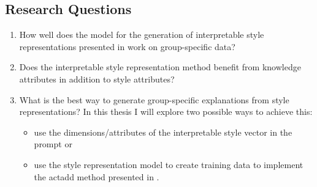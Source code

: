 \subsection{Research Questions}
\begin{enumerate}
  \item How well does the model for the generation of interpretable style representations presented in \citet{patelLearningInterpretableStyle2023} work on group-specific data?
  \item Does the interpretable style representation method benefit from knowledge attributes in addition to style attributes?
  \item What is the best way to generate group-specific explanations from style representations? \newline
  In this thesis I will explore two possible ways to achieve this:
  \begin{itemize}
    \item use the dimensions/attributes of the interpretable style vector in the prompt or
    \item use the style representation model to create training data to implement the \ac{actadd} method presented in \citet{turnerActivationAdditionSteering2024}.
  \end{itemize}
\end{enumerate}
